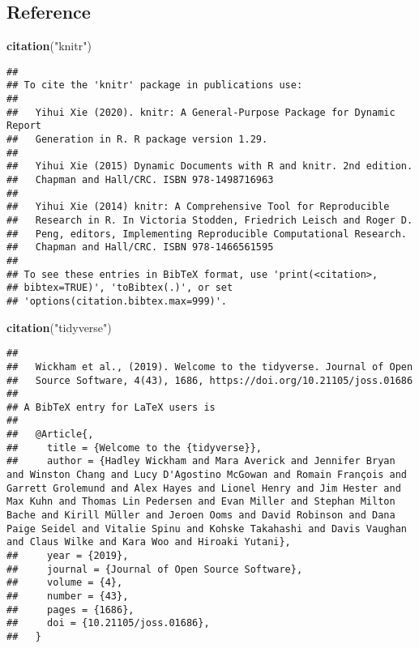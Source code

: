 \documentclass[
]{article}
\newenvironment{Shaded}{\begin{snugshade}}{\end{snugshade}}
\newcommand{\KeywordTok}[1]{\textcolor[rgb]{0.13,0.29,0.53}{\textbf{#1}}}
\newcommand{\NormalTok}[1]{#1}
\newcommand{\StringTok}[1]{\textcolor[rgb]{0.31,0.60,0.02}{#1}}
\begin{document}
\hypertarget{reference}{%
\subsection{Reference}\label{reference}}

\begin{Shaded}
\begin{Highlighting}[]
\KeywordTok{citation}\NormalTok{(}\StringTok{"knitr"}\NormalTok{)}
\end{Highlighting}
\end{Shaded}

\begin{verbatim}
## 
## To cite the 'knitr' package in publications use:
## 
##   Yihui Xie (2020). knitr: A General-Purpose Package for Dynamic Report
##   Generation in R. R package version 1.29.
## 
##   Yihui Xie (2015) Dynamic Documents with R and knitr. 2nd edition.
##   Chapman and Hall/CRC. ISBN 978-1498716963
## 
##   Yihui Xie (2014) knitr: A Comprehensive Tool for Reproducible
##   Research in R. In Victoria Stodden, Friedrich Leisch and Roger D.
##   Peng, editors, Implementing Reproducible Computational Research.
##   Chapman and Hall/CRC. ISBN 978-1466561595
## 
## To see these entries in BibTeX format, use 'print(<citation>,
## bibtex=TRUE)', 'toBibtex(.)', or set
## 'options(citation.bibtex.max=999)'.
\end{verbatim}

\begin{Shaded}
\begin{Highlighting}[]
\KeywordTok{citation}\NormalTok{(}\StringTok{"tidyverse"}\NormalTok{)}
\end{Highlighting}
\end{Shaded}

\begin{verbatim}
## 
##   Wickham et al., (2019). Welcome to the tidyverse. Journal of Open
##   Source Software, 4(43), 1686, https://doi.org/10.21105/joss.01686
## 
## A BibTeX entry for LaTeX users is
## 
##   @Article{,
##     title = {Welcome to the {tidyverse}},
##     author = {Hadley Wickham and Mara Averick and Jennifer Bryan and Winston Chang and Lucy D'Agostino McGowan and Romain François and Garrett Grolemund and Alex Hayes and Lionel Henry and Jim Hester and Max Kuhn and Thomas Lin Pedersen and Evan Miller and Stephan Milton Bache and Kirill Müller and Jeroen Ooms and David Robinson and Dana Paige Seidel and Vitalie Spinu and Kohske Takahashi and Davis Vaughan and Claus Wilke and Kara Woo and Hiroaki Yutani},
##     year = {2019},
##     journal = {Journal of Open Source Software},
##     volume = {4},
##     number = {43},
##     pages = {1686},
##     doi = {10.21105/joss.01686},
##   }
\end{verbatim}
\end{document}

